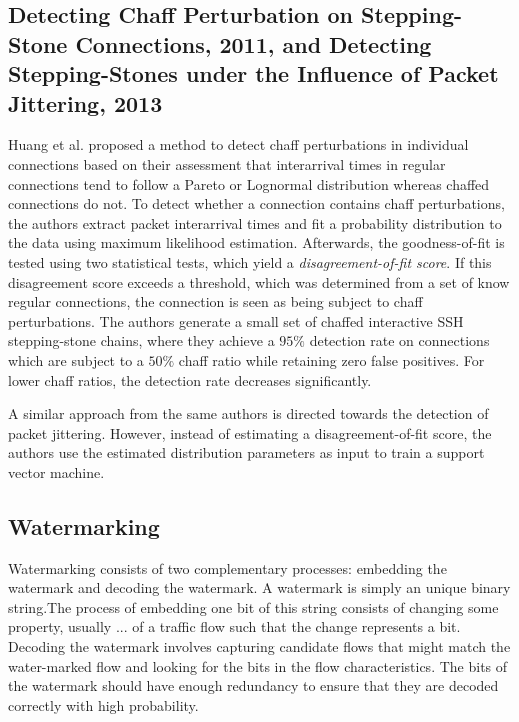 \documentclass[conference]{IEEEtran}\usepackage[]{graphicx}\usepackage[]{color}
\begin{document}
\subsection{Detecting Chaff Perturbation on Stepping-Stone Connections, 2011, and Detecting Stepping-Stones under the  Influence of Packet Jittering, 2013}
Huang et al. \cite{huang2011detecting} proposed a method to detect chaff perturbations in individual connections based on their assessment that interarrival times in regular connections tend to follow a Pareto or Lognormal distribution whereas chaffed connections do not. To detect whether a connection contains chaff perturbations, the authors extract packet interarrival times and fit a probability distribution to the data using maximum likelihood estimation. Afterwards, the goodness-of-fit is tested using two statistical tests, which yield a \textit{disagreement-of-fit score}. If this disagreement score exceeds a threshold, which was determined from a set of know regular connections, the connection is seen as being subject to chaff perturbations. The authors generate a small set of chaffed interactive SSH stepping-stone chains, where they achieve a $95\%$ detection rate on connections which are subject to a $50\%$ chaff ratio while retaining zero false positives. For lower chaff ratios, the detection rate decreases significantly. 

A similar approach from the same authors \cite{ding2013detecting} is directed towards the detection of packet jittering. However, instead of estimating a disagreement-of-fit score, the authors use the estimated distribution parameters as input to train a support vector machine. 

\subsection{Watermarking}

Watermarking consists of two complementary processes: embedding the watermark and decoding the watermark. A watermark is simply an unique binary string.The process of embedding one bit of this string consists of changing some property, usually ... of a traffic flow such that the change represents a bit. Decoding the watermark involves capturing candidate flows that might match the water-marked flow and looking for the bits in the flow characteristics. The bits of the watermark should have enough redundancy to ensure that they are decoded correctly with high probability.
\end{document}
